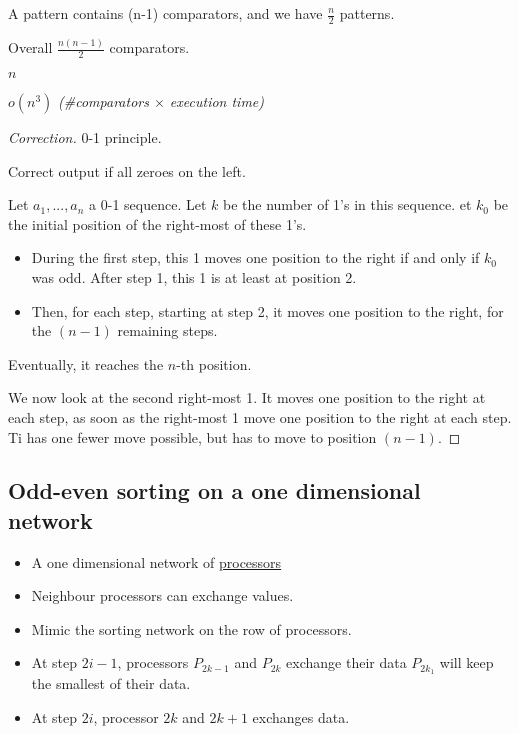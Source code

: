 A pattern contains (n-1) comparators, and we have $\frac{n}{2}$ patterns.

Overall $\frac{n(n-1)}{2}$ comparators.

 $n$

 $o(n^3)$ \textit{(\#{comparators} $\times$ execution time)}

\begin{proof}[Correction]
0-1 principle.

Correct output if all zeroes on the left.

Let $a_1,...,a_n$ a 0-1 sequence. Let $k$ be the number of 1's in this sequence. et $k_0$ be the initial position of the right-most of these 1's. 
\begin{itemize}
\item During the first step, this 1 moves one position to the right if and only if $k_0$ was odd. After step 1, this 1 is at least at position 2.
\item Then, for each step, starting at step 2, it moves one position to the right, for the $(n-1)$ remaining steps.
\end{itemize}
Eventually, it reaches the $n$-th position.

We now look at the second right-most 1. It moves one position to the right at each step, as soon as the right-most 1 move one position to the right at each step. Ti has one fewer move possible, but has to move to position $(n-1)$.
\end{proof}


\subsection{Odd-even sorting on a one dimensional network}

\begin{itemize}
\item A one dimensional network of \underline{processors}
\item Neighbour processors can exchange values.
\item Mimic the sorting network on the row of processors.
\item At step $2i-1$, processors $P_{2k-1}$ and $P_{2k}$ exchange their data $P_{2k_1}$ will keep the smallest of their data.
\item At step $2i$, processor $2k$ and $2k+1$ exchanges data.
\end{itemize}


